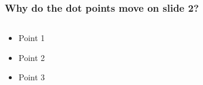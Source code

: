 \documentclass[10pt,aspectratio=169]{beamer}
\begin{document}
    \begin{frame}[t]
      \frametitle{Why do the dot points move on slide 2?}
      \begin{columns}[T]
          \begin{column}{0.5\textwidth}
          \begin{itemize}
              \item Point 1
              \item Point 2
              \item<3-> Point 3
          \end{itemize}
        \end{column}
        \begin{column}{0.5\textwidth}
        \end{column}
      \end{columns}
    \end{frame}
\end{document}
